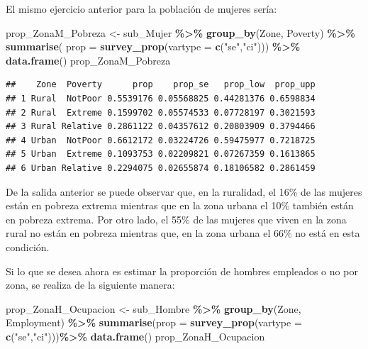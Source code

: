 \documentclass[
  spanish,
  12pt,
]{book}
\newenvironment{Shaded}{\begin{snugshade}}{\end{snugshade}}
\newcommand{\AttributeTok}[1]{\textcolor[rgb]{0.13,0.29,0.53}{#1}}
\newcommand{\FunctionTok}[1]{\textcolor[rgb]{0.13,0.29,0.53}{\textbf{#1}}}
\newcommand{\NormalTok}[1]{#1}
\newcommand{\OtherTok}[1]{\textcolor[rgb]{0.56,0.35,0.01}{#1}}
\newcommand{\SpecialCharTok}[1]{\textcolor[rgb]{0.81,0.36,0.00}{\textbf{#1}}}
\newcommand{\StringTok}[1]{\textcolor[rgb]{0.31,0.60,0.02}{#1}}
\begin{document}
El mismo ejercicio anterior para la población de mujeres sería:

\begin{Shaded}
\begin{Highlighting}[]
\NormalTok{prop\_ZonaM\_Pobreza }\OtherTok{\textless{}{-}}\NormalTok{ sub\_Mujer }\SpecialCharTok{\%\textgreater{}\%} 
                      \FunctionTok{group\_by}\NormalTok{(Zone, Poverty) }\SpecialCharTok{\%\textgreater{}\%} 
                      \FunctionTok{summarise}\NormalTok{( }\AttributeTok{prop =} \FunctionTok{survey\_prop}\NormalTok{(}\AttributeTok{vartype =} \FunctionTok{c}\NormalTok{(}\StringTok{"se"}\NormalTok{,}\StringTok{"ci"}\NormalTok{))) }\SpecialCharTok{\%\textgreater{}\%}
                      \FunctionTok{data.frame}\NormalTok{()}
\NormalTok{prop\_ZonaM\_Pobreza}
\end{Highlighting}
\end{Shaded}

\begin{verbatim}
##    Zone  Poverty      prop    prop_se   prop_low  prop_upp
## 1 Rural  NotPoor 0.5539176 0.05568825 0.44281376 0.6598834
## 2 Rural  Extreme 0.1599702 0.05574533 0.07728197 0.3021593
## 3 Rural Relative 0.2861122 0.04357612 0.20803909 0.3794466
## 4 Urban  NotPoor 0.6612172 0.03224726 0.59475977 0.7218725
## 5 Urban  Extreme 0.1093753 0.02209821 0.07267359 0.1613865
## 6 Urban Relative 0.2294075 0.02655874 0.18106582 0.2861459
\end{verbatim}

De la salida anterior se puede observar que, en la ruralidad, el 16\% de las mujeres están en pobreza extrema mientras que en la zona urbana el 10\% también están en pobreza extrema. Por otro lado, el 55\% de las mujeres que viven en la zona rural no están en pobreza mientras que, en la zona urbana el 66\% no está en esta condición.

Si lo que se desea ahora es estimar la proporción de hombres empleados o no por zona, se realiza de la siguiente manera:

\begin{Shaded}
\begin{Highlighting}[]
\NormalTok{prop\_ZonaH\_Ocupacion }\OtherTok{\textless{}{-}}\NormalTok{ sub\_Hombre }\SpecialCharTok{\%\textgreater{}\%}
                        \FunctionTok{group\_by}\NormalTok{(Zone, Employment) }\SpecialCharTok{\%\textgreater{}\%} 
                        \FunctionTok{summarise}\NormalTok{(}\AttributeTok{prop =} \FunctionTok{survey\_prop}\NormalTok{(}\AttributeTok{vartype =} \FunctionTok{c}\NormalTok{(}\StringTok{"se"}\NormalTok{,}\StringTok{"ci"}\NormalTok{)))}\SpecialCharTok{\%\textgreater{}\%}
                        \FunctionTok{data.frame}\NormalTok{()}
\NormalTok{prop\_ZonaH\_Ocupacion}
\end{Highlighting}
\end{Shaded}
\end{document}
